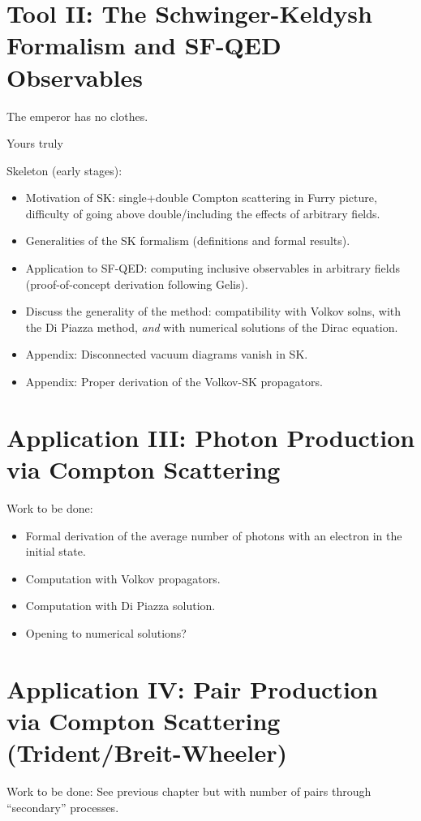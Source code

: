 \documentclass[11pt,SymmetricalJury]{inrsthesis/inrsthesis}
\begin{document}
\chapter{Tool II: The Schwinger-Keldysh Formalism and SF-QED Observables}

\epigraph{The emperor has no clothes.}{Yours truly}


Skeleton (early stages):
  \begin{itemize}
      \item Motivation of SK: single+double Compton scattering in Furry picture,
            difficulty of going above double/including the effects of arbitrary fields.
      \item Generalities of the SK formalism (definitions and formal results).
      \item Application to SF-QED: computing inclusive observables in
            arbitrary fields (proof-of-concept derivation following Gelis).
      \item Discuss the generality of the method: compatibility with
            Volkov solns, with the Di Piazza method, \textit{and} with numerical
            solutions of the Dirac equation.
      \item Appendix: Disconnected vacuum diagrams vanish in SK.
      \item Appendix: Proper derivation of the Volkov-SK propagators.
  \end{itemize}


\chapter{Application III: Photon Production via Compton Scattering}

Work to be done:
  \begin{itemize}
      \item Formal derivation of the average number of photons with an electron
            in the initial state.
      \item Computation with Volkov propagators.
      \item Computation with Di Piazza solution.
      \item Opening to numerical solutions?
\end{itemize}

\chapter{Application IV: Pair Production via Compton Scattering (Trident/Breit-Wheeler)}


Work to be done:
See previous chapter but with number of pairs through ``secondary'' processes.


\backmatter



\end{document}
